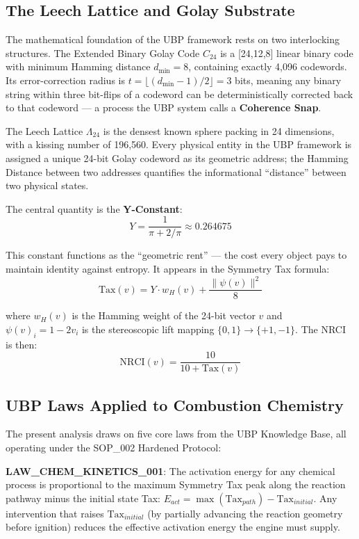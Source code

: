 \documentclass[12pt,a4paper]{article}
\begin{document}
\subsection{The Leech Lattice and Golay Substrate}

The mathematical foundation of the UBP framework rests on two interlocking structures.
The Extended Binary Golay Code $C_{24}$ is a [24,12,8] linear binary code with minimum
Hamming distance $d_{\min} = 8$, containing exactly 4,096 codewords. Its
error-correction radius is $t = \lfloor(d_{\min}-1)/2\rfloor = 3$ bits, meaning any
binary string within three bit-flips of a codeword can be deterministically corrected
back to that codeword --- a process the UBP system calls a \textbf{Coherence Snap}.

The Leech Lattice $\Lambda_{24}$ is the densest known sphere packing in 24 dimensions,
with a kissing number of 196,560. Every physical entity in the UBP framework is
assigned a unique 24-bit Golay codeword as its geometric address; the Hamming Distance
between two addresses quantifies the informational ``distance'' between two physical
states.

The central quantity is the \textbf{Y-Constant}:
\[
Y = \frac{1}{\pi + 2/\pi} \approx 0.264675
\]

This constant functions as the ``geometric rent'' --- the cost every object pays to
maintain identity against entropy. It appears in the Symmetry Tax formula:
\[
\text{Tax}(v) = Y \cdot w_H(v) + \frac{\|\psi(v)\|^2}{8}
\]

where $w_H(v)$ is the Hamming weight of the 24-bit vector $v$ and
$\psi(v)_i = 1 - 2v_i$ is the stereoscopic lift mapping $\{0,1\} \rightarrow \{+1,-1\}$.
The NRCI is then:
\[
\text{NRCI}(v) = \frac{10}{10 + \text{Tax}(v)}
\]

\subsection{UBP Laws Applied to Combustion Chemistry}

The present analysis draws on five core laws from the UBP Knowledge Base, all
operating under the SOP\_002 Hardened Protocol:

\textbf{LAW\_CHEM\_KINETICS\_001}: The activation energy for any chemical process is
proportional to the maximum Symmetry Tax peak along the reaction pathway minus the
initial state Tax: $E_{act} = \max(\text{Tax}_{path}) - \text{Tax}_{initial}$.
Any intervention that raises $\text{Tax}_{initial}$ (by partially advancing the
reaction geometry before ignition) reduces the effective activation energy the engine
must supply.
\end{document}
